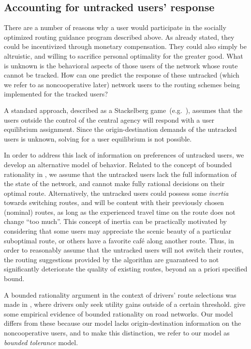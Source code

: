 \subsection{Accounting for untracked users' response\label{sub:Accounting-for-untracked}}

There are a number of reasons why a user would participate in the
socially optimized routing guidance program described above. As already
stated, they could be incentivized through monetary compensation.
They could also simply be altruistic, and willing to sacrifice personal
optimality for the greater good. What is unknown is the behavioral
aspects of those users of the network whose route cannot be tracked.
How can one predict the response of these untracked (which we refer
to as noncooperative later) network users to the routing schemes being
implemented for the tracked users?

A standard approach, described as a Stackelberg game~(e.g.~\cite{roughgarden2001stackelberg,Krichene2012a}),
assumes that the users outside the control of the central agency will
respond with a user equilibrium assignment. Since the origin-destination
demands of the untracked users is unknown, solving for a user equilibrium
is not possible.

In order to address this lack of information on preferences of untracked
users, we develop an alternative model of behavior. Related to the
concept of bounded rationality in \cite{Guo2011,Hu199751}, we assume
that the untracked users lack the full information of the state of
the network, and cannot make fully rational decisions on their optimal
route. Alternatively, the untracked users could possess some \emph{inertia}
towards switching routes, and will be content with their previously
chosen (nominal) routes, as long as the experienced travel time on
the route does not change ``too much''. This concept of inertia
can be practically motivated by considering that some users may appreciate
the scenic beauty of a particular suboptimal route, or others have
a favorite café along another route. Thus, in order to reasonably
assume that the untracked users will not switch their routes, the
routing suggestions provided by the algorithm are guaranteed to not
significantly deteriorate the quality of existing routes, beyond an
a priori specified bound.

A bounded rationality argument in the context of drivers' route selections
was made in \cite{Hu199751}, where drivers only seek utility gains
outside of a certain threshold. \cite{Guo2011} give some empirical
evidence of bounded rationality on road networks. Our model differs
from these because our model lacks origin-destination information
on the noncooperative users, and to make this distinction, we refer
to our model as \emph{bounded tolerance} model.


